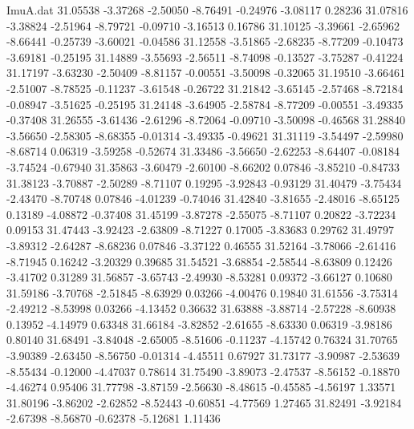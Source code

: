 \begin{filecontents}{ImuA.dat}
  31.05538   -3.37268   -2.50050   -8.76491   -0.24976   -3.08117    0.28236
  31.07816   -3.38824   -2.51964   -8.79721   -0.09710   -3.16513    0.16786
  31.10125   -3.39661   -2.65962   -8.66441   -0.25739   -3.60021   -0.04586
  31.12558   -3.51865   -2.68235   -8.77209   -0.10473   -3.69181   -0.25195
  31.14889   -3.55693   -2.56511   -8.74098   -0.13527   -3.75287   -0.41224
  31.17197   -3.63230   -2.50409   -8.81157   -0.00551   -3.50098   -0.32065
  31.19510   -3.66461   -2.51007   -8.78525   -0.11237   -3.61548   -0.26722
  31.21842   -3.65145   -2.57468   -8.72184   -0.08947   -3.51625   -0.25195
  31.24148   -3.64905   -2.58784   -8.77209   -0.00551   -3.49335   -0.37408
  31.26555   -3.61436   -2.61296   -8.72064   -0.09710   -3.50098   -0.46568
  31.28840   -3.56650   -2.58305   -8.68355   -0.01314   -3.49335   -0.49621
  31.31119   -3.54497   -2.59980   -8.68714    0.06319   -3.59258   -0.52674
  31.33486   -3.56650   -2.62253   -8.64407   -0.08184   -3.74524   -0.67940
  31.35863   -3.60479   -2.60100   -8.66202    0.07846   -3.85210   -0.84733
  31.38123   -3.70887   -2.50289   -8.71107    0.19295   -3.92843   -0.93129
  31.40479   -3.75434   -2.43470   -8.70748    0.07846   -4.01239   -0.74046
  31.42840   -3.81655   -2.48016   -8.65125    0.13189   -4.08872   -0.37408
  31.45199   -3.87278   -2.55075   -8.71107    0.20822   -3.72234    0.09153
  31.47443   -3.92423   -2.63809   -8.71227    0.17005   -3.83683    0.29762
  31.49797   -3.89312   -2.64287   -8.68236    0.07846   -3.37122    0.46555
  31.52164   -3.78066   -2.61416   -8.71945    0.16242   -3.20329    0.39685
  31.54521   -3.68854   -2.58544   -8.63809    0.12426   -3.41702    0.31289
  31.56857   -3.65743   -2.49930   -8.53281    0.09372   -3.66127    0.10680
  31.59186   -3.70768   -2.51845   -8.63929    0.03266   -4.00476    0.19840
  31.61556   -3.75314   -2.49212   -8.53998    0.03266   -4.13452    0.36632
  31.63888   -3.88714   -2.57228   -8.60938    0.13952   -4.14979    0.63348
  31.66184   -3.82852   -2.61655   -8.63330    0.06319   -3.98186    0.80140
  31.68491   -3.84048   -2.65005   -8.51606   -0.11237   -4.15742    0.76324
  31.70765   -3.90389   -2.63450   -8.56750   -0.01314   -4.45511    0.67927
  31.73177   -3.90987   -2.53639   -8.55434   -0.12000   -4.47037    0.78614
  31.75490   -3.89073   -2.47537   -8.56152   -0.18870   -4.46274    0.95406
  31.77798   -3.87159   -2.56630   -8.48615   -0.45585   -4.56197    1.33571
  31.80196   -3.86202   -2.62852   -8.52443   -0.60851   -4.77569    1.27465
  31.82491   -3.92184   -2.67398   -8.56870   -0.62378   -5.12681    1.11436

\end{filecontents}
